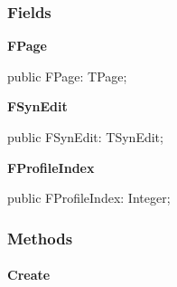 \documentclass{report}
\newif\ifpdf
\begin{document}
\subsubsection*{\large{\textbf{Fields}}\normalsize\hspace{1ex}\hfill}
\begin{list}{}{
\setlength{\itemindent}{0cm}
\setlength{\listparindent}{0cm}
\setlength{\leftmargin}{\evensidemargin}
\addtolength{\leftmargin}{\tmplength}
\settowidth{\labelsep}{X}
\addtolength{\leftmargin}{\labelsep}
\setlength{\labelwidth}{\tmplength}
}
\label{editor.TFileProfile-FPage}
\item[\textbf{FPage}\hfill]
\ifpdf
\begin{flushleft}
\fi
\begin{ttfamily}
public FPage: TPage;\end{ttfamily}

\ifpdf
\end{flushleft}
\fi


\par  \label{editor.TFileProfile-FSynEdit}
\item[\textbf{FSynEdit}\hfill]
\ifpdf
\begin{flushleft}
\fi
\begin{ttfamily}
public FSynEdit: TSynEdit;\end{ttfamily}

\ifpdf
\end{flushleft}
\fi


\par  \label{editor.TFileProfile-FProfileIndex}
\item[\textbf{FProfileIndex}\hfill]
\ifpdf
\begin{flushleft}
\fi
\begin{ttfamily}
public FProfileIndex: Integer;\end{ttfamily}

\ifpdf
\end{flushleft}
\fi


\par  \end{list}
\subsubsection*{\large{\textbf{Methods}}\normalsize\hspace{1ex}\hfill}
\paragraph*{Create}\hspace*{\fill}
\end{document}
